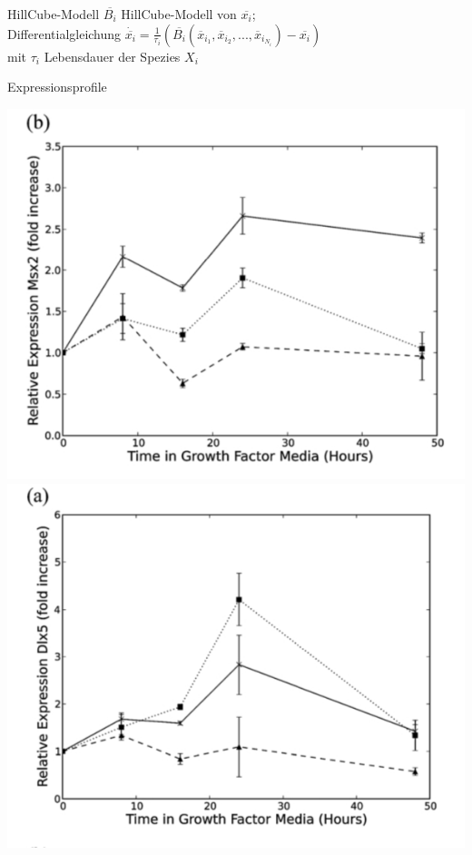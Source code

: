 \documentclass[]{beamer}
\begin{document}
\begin{frame}{HillCube-Modell}
$\overline{B_{i}}$ HillCube-Modell von $\overline{x_{i}}$; 
	\pause
	\\ Differentialgleichung $\dot{\overline{x_{i}}} = \frac{1}{\tau_{i}} (\overline{B_{i}}(\overline{x}_{i_{1}},\overline{x}_{i_{2}},...,\overline{x}_{i_{N_{i}}}) - \overline{x_{i}})$
	\\ mit $\tau_{i}$ Lebensdauer der Spezies $X_{i}$
\end{frame}

\begin{frame}{Expressionsprofile}
\begin{center}
			\includegraphics[scale=0.18]{Expression_Msx2.jpg}
			\includegraphics[scale=0.18]{Expression_Dlx5.jpg}

\end{center}
\end{frame}
\end{document}
